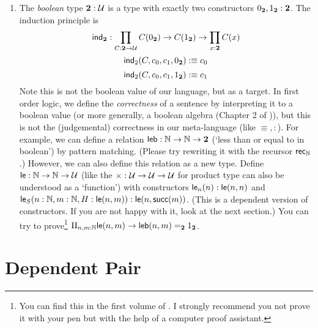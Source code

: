 \begin{enumerate}
    \item The {\it boolean} type $\mathbf{2}:\mathcal{U}$ is a type with exactly
    two constructors $0_{\mathbf{2}},1_{\mathbf{2}}:\mathbf{2}$. The induction principle is 
    $$
    \text{\sf ind}_{\mathbf{2}}:\prod_{C:\mathbf{2}\to\mathcal{U}}C(0_{\mathbf{2}})\to C(1_{\mathbf{2}})\to\prod_{x:\mathbf{2}}C(x)
    $$
    $$
        \text{\sf ind}_2(C,c_0,c_1,0_{\mathbf{2}}):\equiv c_0
    $$
    $$
        \text{\sf ind}_2(C,c_0,c_1,1_{\mathbf{2}}):\equiv c_1
    $$
    Note this is not the boolean value of our language, but as a target.
    In first order logic, we define the {\it correctness} of a sentence
    by interpreting it to a boolean value (or more generally, a boolean
    algebra (Chapter 2 of \cite{Curry-Howard})), but this is not the
    (judgemental) correctness in our meta-language (like $\equiv,:$).
    For example, we can define a relation $\text{\sf leb}:\mathbb{N}\to\mathbb{N}\to\mathbf{2}$ 
    (`less than or equal to in boolean') by pattern matching. (Please try
    rewriting it with the recursor $\text{\sf rec}_{\mathbb{N}}$.)
    However, we can also define this relation as a new type.
    Define $\text{\sf le}: \mathbb{N}\to\mathbb{N}\to\mathcal{U}$ (like the $\times:\mathcal{U}
    \to\mathcal{U}\to\mathcal{U}$ for product type can also be understood as a 
    `function') with constructors $\text{\sf le}_n(n): \text{\sf le}(n, n)$ and
    $\text{\sf le}_S(n:\mathbb{N}, m:\mathbb{N}, H: \text{\sf le}(n, m)): \text{\sf le}(n,\text{\sf succ}(m))$.
    (This is a dependent version of constructors. If you are not happy 
    with it, look at the next section.)
    You can try to prove\footnote{You can find this in the first volume of
    \cite{SF}. I strongly recommend you not prove it with your pen but with
    the help of a computer proof assistant.} 
    $\Pi_{n,m:\mathbb{N}}\text{\sf le}(n,m)\to \text{\sf leb}(n,m)=_{\mathbf{2}} 1_{\mathbf{2}}$.
\end{enumerate}

\section{Dependent Pair}

